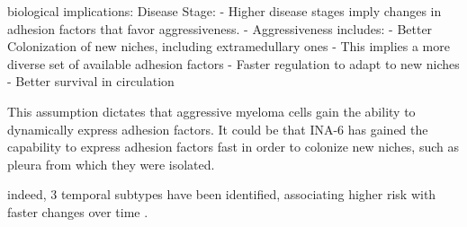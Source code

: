 






\unnsubsection{\caddadaptabilitytitle}%
\label{sec:discussion_caddadaptability}%

biological implications:
Disease Stage:
- Higher disease stages imply changes in adhesion factors that favor aggressiveness.
- Aggressiveness includes:
- Better Colonization of new niches, including extramedullary ones
- This implies a more diverse set of available adhesion factors
- Faster regulation to adapt to new niches
- Better survival in circulation



This assumption dictates that aggressive myeloma cells gain the ability
to dynamically express adhesion factors.
It could be that INA-6 has gained the capability to express adhesion factors
fast in order to colonize new niches, such as pleura from which they were
isolated.


indeed, 3 temporal subtypes have been identified, associating higher risk with
faster changes over time \cite{keatsClonalCompetitionAlternating2012}.

